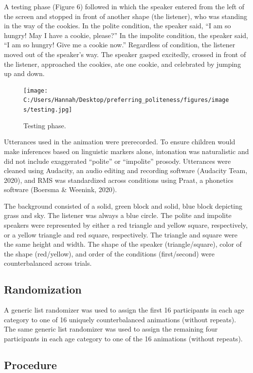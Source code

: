 \documentclass[
  english,
  man,floatsintext]{apa6}
\begin{document}
A testing phase (Figure 6) followed in which the speaker entered from the left of the screen and stopped in front of another shape (the listener), who was standing in the way of the cookies. In the polite condition, the speaker said, ``I am so hungry! May I have a cookie, please?'' In the impolite condition, the speaker said, ``I am so hungry! Give me a cookie now.'' Regardless of condition, the listener moved out of the speaker's way. The speaker gasped excitedly, crossed in front of the listener, approached the cookies, ate one cookie, and celebrated by jumping up and down.

\begin{figure}
\centering
\texttt{[image: C:/Users/Hannah/Desktop/preferring\_politeness/figures/images/testing.jpg]}
\caption{Testing phase.}
\end{figure}

Utterances used in the animation were prerecorded. To ensure children would make inferences based on linguistic markers alone, intonation was naturalistic and did not include exaggerated ``polite'' or ``impolite'' prosody. Utterances were cleaned using Audacity, an audio editing and recording software (Audacity Team, 2020), and RMS was standardized across conditions using Praat, a phonetics software (Boersma \& Weenink, 2020).

The background consisted of a solid, green block and solid, blue block depicting grass and sky. The listener was always a blue circle. The polite and impolite speakers were represented by either a red triangle and yellow square, respectively, or a yellow triangle and red square, respectively. The triangle and square were the same height and width. The shape of the speaker (triangle/square), color of the shape (red/yellow), and order of the conditions (first/second) were counterbalanced across trials.

\hypertarget{randomization}{%
\subsection{Randomization}\label{randomization}}

A generic list randomizer was used to assign the first 16 participants in each age category to one of 16 uniquely counterbalanced animations (without repeats). The same generic list randomizer was used to assign the remaining four participants in each age category to one of the 16 animations (without repeats).

\hypertarget{procedure}{%
\subsection{Procedure}\label{procedure}}
\end{document}
